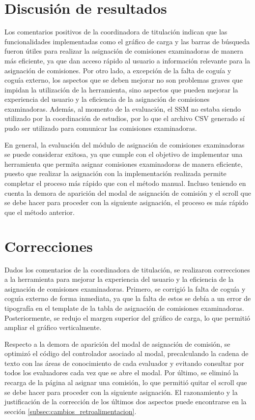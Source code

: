 \section{Discusión de resultados}

Los comentarios positivos de la coordinadora de titulación indican que las funcionalidades
implementadas como el gráfico de carga y las barras de búsqueda fueron útiles para
realizar la asignación de comisiones examinadoras de manera más eficiente, ya que
dan acceso rápido al usuario a información relevante para la asignación de comisiones.
Por otro lado, a excepción de la falta de coguía y coguía externo, los aspectos que se deben
mejorar no son problemas graves que impidan la utilización de la herramienta, sino aspectos
que pueden mejorar la experiencia del usuario y la eficiencia de la asignación de comisiones
examinadoras. Además, al momento de la evaluación, el SSM no estaba siendo utilizado por la
coordinación de estudios, por lo que el archivo CSV generado sí pudo ser utilizado para comunicar
las comisiones examinadoras.

En general, la evaluación del módulo de asignación de comisiones examinadoras se puede considerar
exitosa, ya que cumple con el objetivo de implementar una herramienta que permita asignar
comisiones examinadoras de manera eficiente, puesto que realizar la asignación con la
implementación realizada permite completar el proceso más rápido que con el método manual.
Incluso teniendo en cuenta la demora de aparición del modal de asignación de comisión y el scroll
que se debe hacer para proceder con la siguiente asignación, el proceso es más rápido que el método
anterior.

\section{Correcciones}
Dados los comentarios de la coordinadora de titulación, se realizaron correcciones a la herramienta
para mejorar la experiencia del usuario y la eficiencia de la asignación de comisiones examinadoras.
Primero, se corrigió la falta de coguía y coguía externo de forma inmediata, ya que la falta de estos
se debía a un error de tipografía en el template de la tabla de asignación de comisiones examinadoras.
Posteriormente, se redujo el margen superior del gráfico de carga, lo que permitió ampliar el gráfico
verticalmente.

Respecto a la demora de aparición del modal de asignación de comisión, se optimizó el código del
controlador asociado al modal, precalculando la cadena de texto con las áreas de conocimiento
de cada evaluador y evitando consultar por todos los evaluadores cada vez que se abre el modal.
Por último, se eliminó la recarga de la página al asignar una comisión, lo que permitió quitar
el scroll que se debe hacer para proceder con la siguiente asignación. El razonamiento y la justificación
de la corrección de los últimos dos aspectos puede encontrarse en la sección \ref{subsec:cambios_retroalimentacion}.


